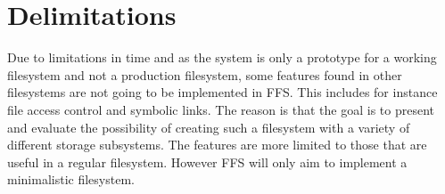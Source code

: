 \section{Delimitations} %

Due to limitations in time and as the system is only a prototype for a working filesystem and not a production filesystem, some features found in other filesystems are not going to be implemented in FFS. This includes for instance file access control and symbolic links. The reason is that the goal is to present and evaluate the possibility of creating such a filesystem with a variety of different storage subsystems. The features are more limited to those that are useful in a regular filesystem. However FFS will only aim to implement a minimalistic filesystem. %